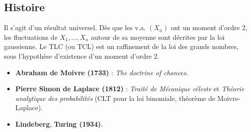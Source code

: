 \subsection*{Histoire}
Il s'agit d'un résultat universel. Dès que les v.a. $(X_n)$ ont un moment d'ordre 2, les fluctuations de $X_1, \dots, X_n$ autour de sa moyenne sont décrites par la loi gaussienne. Le TLC (ou TCL) est un raffinement de la loi des grands nombres, sous l'hypothèse d'existence d'un moment d'ordre 2.
\begin{itemize}
    \item \textbf{Abraham de Moivre (1733)} : \textit{The doctrine of chances}.
    \item \textbf{Pierre Simon de Laplace (1812)} : \textit{Traité de Mécanique céleste} et \textit{Théorie analytique des probabilités} (CLT pour la loi binomiale, théorème de Moivre-Laplace).
    \item \textbf{Lindeberg}, \textbf{Turing (1934)}.
\end{itemize}
